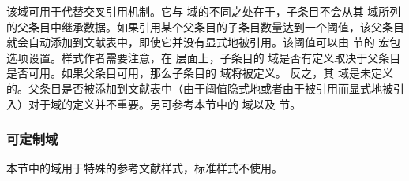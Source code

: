 \begin{fieldlist}


该域可用于代替交叉引用机制。它与  域的不同之处在于，子条目不会从其  域所列的父条目中继承数据。如果引用某个父条目的子条目数量达到一个阈值，该父条目就会自动添加到文献表中，即使它并没有显式地被引用。该阈值可以由  节的  宏包选项设置。样式作者需要注意，在 \biblatex 层面上，子条目的  域是否有定义取决于父条目是否可用。如果父条目可用，那么子条目的  域将被定义。
反之，其  域是未定义的。父条目是否被添加到文献表中（由于阈值隐式地或者由于被引用而显式地被引入）对于域的定义并不重要。另可参考本节中的  域以及  节。

\end{fieldlist}

\subsubsection{可定制域}
\label{bib:fld:ctm}


本节中的域用于特殊的参考文献样式，标准样式不使用。


